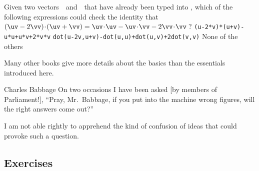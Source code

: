 \begin{activity}
Given two vectors~\uv\ and~\vv\ that have already been typed into \script,
which of the following expressions could check the identity that \((\uv-2\vv)\cdot(\uv+\vv)=\uv\cdot\uv-\uv\cdot\vv-2\vv\cdot\vv\)\,?
{\tt (u-2*v)*(u+v)-u*u+u*v+2*v*v}
{\tt dot(u-2v,u+v)-dot(u,u)+dot(u,v)+2dot(v,v)}
{None of the others}
\end{activity}




Many other books \cite[\S\S1.1--3, e.g.]{Quarteroni2006} give more details about the basics than the essentials introduced here.




\begin{quoted}{Charles Babbage}%
On two occasions I have been asked [by members of 
Parliament!], ``Pray, Mr.~Babbage, if you put into the machine wrong figures, will the right answers come out?''

I am not able rightly to apprehend the kind of confusion of ideas that could provoke such a question.
\end{quoted}




\subsection{Exercises}


